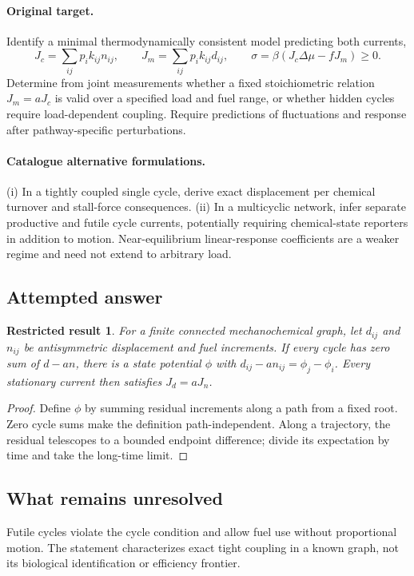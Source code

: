 \documentclass[11pt]{article}
\newtheorem{attemptresult}{Restricted result}[section]
\begin{document}
\paragraph{Original target.}
Identify a minimal thermodynamically consistent model predicting both currents,
\[J_c=\sum_{ij}p_i k_{ij}n_{ij},\qquad J_m=\sum_{ij}p_i k_{ij}d_{ij},\qquad \sigma=\beta(J_c\Delta\mu-fJ_m)\ge0.\]
Determine from joint measurements whether a fixed stoichiometric relation $J_m=aJ_c$ is valid over a specified load and fuel range, or whether hidden cycles require load-dependent coupling. Require predictions of fluctuations and response after pathway-specific perturbations.
\paragraph{Catalogue alternative formulations.}
(i) In a tightly coupled single cycle, derive exact displacement per chemical turnover and stall-force consequences. (ii) In a multicyclic network, infer separate productive and futile cycle currents, potentially requiring chemical-state reporters in addition to motion. Near-equilibrium linear-response coefficients are a weaker regime and need not extend to arbitrary load.
\subsection{Attempted answer}
\begin{attemptresult}
For a finite connected mechanochemical graph, let $d_{ij}$ and $n_{ij}$ be antisymmetric displacement and fuel increments. If every cycle has zero sum of $d-an$, there is a state potential $\phi$ with $d_{ij}-an_{ij}=\phi_j-\phi_i$. Every stationary current then satisfies $J_d=aJ_n$.
\end{attemptresult}
\begin{proof}
Define $\phi$ by summing residual increments along a path from a fixed root. Zero cycle sums make the definition path-independent. Along a trajectory, the residual telescopes to a bounded endpoint difference; divide its expectation by time and take the long-time limit.
\end{proof}
\subsection{What remains unresolved}
Futile cycles violate the cycle condition and allow fuel use without proportional motion. The statement characterizes exact tight coupling in a known graph, not its biological identification or efficiency frontier.
\end{document}
